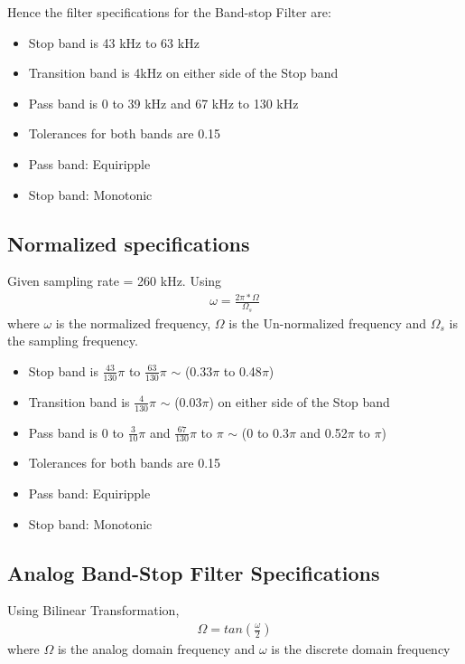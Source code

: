 \documentclass[12pt]{article}
\begin{document}
	\noindent Hence the filter specifications for the Band-stop Filter are:
	\begin{itemize}
		\item Stop band is 43 kHz to 63 kHz
		\item Transition band is 4kHz on either side of the Stop band
		\item Pass band is 0 to 39 kHz and 67 kHz to 130 kHz
		\item Tolerances for both bands are 0.15
		\item Pass band: Equiripple
		\item Stop band: Monotonic 
	\end{itemize}
	
	\color{cyan}
	\subsection{Normalized specifications}
	\color{black}
	Given sampling rate  = 260 kHz. Using\\
	\begin{gather*}
		\omega = \frac{2\pi \ast \Omega}{\Omega_s}
	\end{gather*}
	where $\omega$ is the normalized frequency, $\Omega$ is the Un-normalized frequency and $\Omega_s$ is the sampling frequency.
	\begin{itemize}
		\item Stop band is $\frac{43}{130}\pi$ to $\frac{63}{130}\pi$ $\sim$ (0.33$\pi$ to 0.48$\pi$)
		\item Transition band is $\frac{4}{130}\pi$ $\sim$ (0.03$\pi$) on either side of the Stop band
		\item Pass band is 0 to  $\frac{3}{10}\pi$ and $\frac{67}{130}\pi$ to $\pi$  $\sim$ (0 to 0.3$\pi$ and  0.52$\pi$ to $\pi$)
		\item Tolerances for both bands are 0.15
		\item Pass band: Equiripple
		\item Stop band: Monotonic
	\end{itemize}
	
	\color{cyan}
	\subsection{Analog Band-Stop Filter Specifications}
	\color{black}
	Using Bilinear Transformation,
	\begin{gather*}
		\Omega = tan\left(\frac{\omega}{2}\right)
	\end{gather*}
	where $\Omega$ is the analog domain frequency and $\omega$ is the discrete domain frequency\\
	
\end{document}
